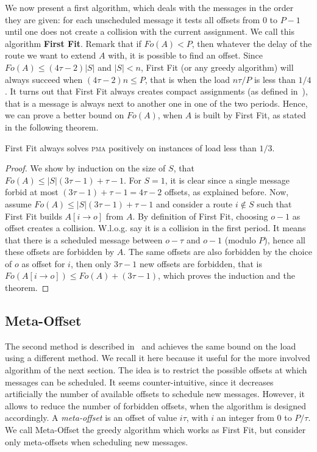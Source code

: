 \documentclass[a4paper,UKenglish,cleveref, autoref, thm-restate]{lipics-v2019}
\newcommand\pma{\textsc{pma}\xspace}
\begin{document}
We now present a first algorithm, which deals with the messages in the order they are given:  for each unscheduled message it tests all offsets from $0$ to $P-1$ until one does not create a collision with the current assignment.
We call this algorithm \textbf{First Fit}. Remark that if $Fo(A) < P$, then whatever the delay of the route we want to extend $A$ with, it is possible to find an offset. Since $Fo(A) \leq (4 \tau -2)|S|$ and $|S| < n$, First Fit (or any greedy algorithm) will always succeed when $(4 \tau -2)n \leq P$, that is when the load $ n\tau /P$ is less than $1/4$.
It turns out that First Fit always creates compact assignments (as defined in~\cite{dominique2018deterministic}), that is a message is always next to another one in one of the two periods. Hence, we can prove a better bound on $Fo(A)$, when $A$ is built by First Fit, as stated in the following theorem.

\begin{theorem}
First Fit always solves \pma positively on instances of load less than $1/3$. 
\end{theorem}
\begin{proof}
We show by induction on the size of $S$, that $Fo(A) \leq |S|(3\tau -1) + \tau -1$. For $S = 1$, it is clear since a single message forbid at most $(3\tau -1) + \tau -1 = 4\tau-2$ offsets, as explained before. Now, assume $Fo(A) \leq |S|(3\tau -1) + \tau -1$ and consider a route $i \notin S$ such that First Fit builds $A[i \rightarrow o]$ from $A$. By definition of First Fit, choosing $o-1$ as offset creates a collision. W.l.o.g. say it is a collision in the first period. It means that there is a scheduled message between $o - \tau $ and $o-1$ (modulo $P$), hence all these offsets are forbidden by $A$. The same offsets are also forbidden by the choice of $o$ as offset for $i$, then only $3\tau -1$ new offsets are forbidden, that is $Fo(A[i \rightarrow o]) \leq Fo(A) + (3\tau -1)$, which proves the induction and the theorem.
\end{proof}

\subsection{Meta-Offset}

The second method is described  in~\cite{dominique2018deterministic} and achieves the same bound on the load using a different method. We recall it here because it useful for the more involved algorithm of the next section.
The idea is to restrict the possible offsets at which messages can be scheduled. It seems counter-intuitive, since it decreases artificially the number of available offsets to schedule new messages. However, it allows to reduce the number of forbidden offsets, when the algorithm is designed accordingly. A \emph{meta-offset} is an offset of value $i\tau$,
with $i$ an integer from $0$ to $P / \tau$. We call Meta-Offset the greedy algorithm which works as First Fit, but consider only meta-offsets when scheduling new messages. 
\end{document}
